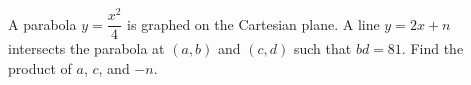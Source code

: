 A parabola $y = \dfrac{x^2}{4}$ is graphed on the Cartesian plane. A line $y = 2x + n$ intersects the parabola at $(a, b)$ and $(c, d)$ such that $bd = 81$. Find the product of $a$, $c$, and $-n$.
